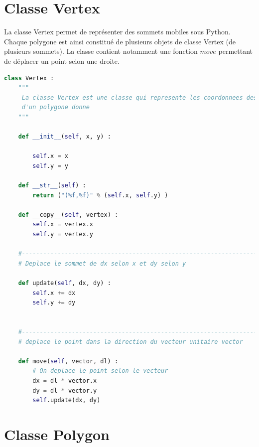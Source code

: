 \documentclass[a4paper,reqno]{article}
\begin{document}

\section*{Classe Vertex}

La classe Vertex permet de représenter des sommets mobiles sous Python. Chaque polygone est ainsi constitué de plusieurs objets de classe Vertex (de plusieurs sommets). La classe contient notamment une fonction $move$ permettant de déplacer un point selon une droite.

\begin{lstlisting}[language=Python,frame=single,caption=Création d'une classe Vertex]
class Vertex : 
    """
     La classe Vertex est une classe qui represente les coordonnees des points 
     d'un polygone donne 
    """
    
    def __init__(self, x, y) : 
        
        self.x = x 
        self.y = y 
    
    def __str__(self) : 
        return ("(%f,%f)" % (self.x, self.y) )
    
    def __copy__(self, vertex) : 
        self.x = vertex.x 
        self.y = vertex.y 
    
    #---------------------------------------------------------------------    
    # Deplace le sommet de dx selon x et dy selon y 
    
    def update(self, dx, dy) : 
        self.x += dx 
        self.y += dy 
        
        
    #---------------------------------------------------------------------   
    # deplace le point dans la direction du vecteur unitaire vector 
    
    def move(self, vector, dl) : 
        # On deplace le point selon le vecteur
        dx = dl * vector.x 
        dy = dl * vector.y 
        self.update(dx, dy) 
\end{lstlisting}


\section*{Classe Polygon}
\end{document}
